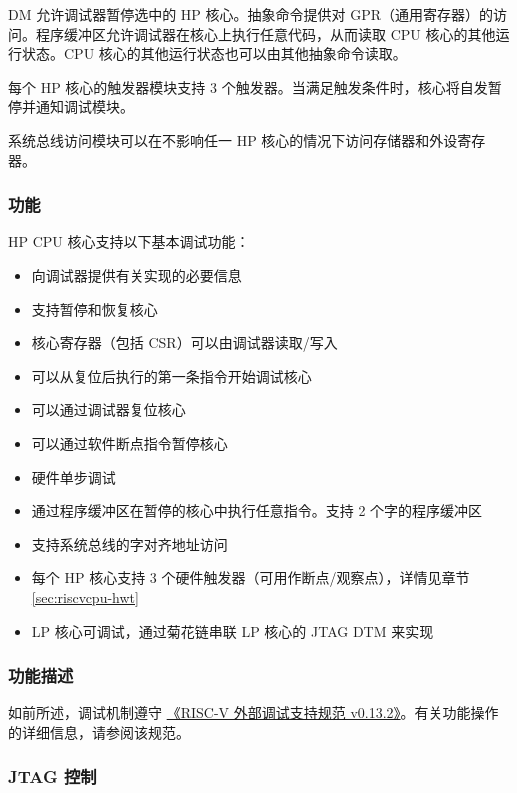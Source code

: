 \documentclass[main\_\_CN.tex]{subfiles}
\begin{document}
DM 允许调试器暂停选中的 HP 核心。抽象命令提供对 GPR（通用寄存器）的访问。程序缓冲区允许调试器在核心上执行任意代码，从而读取 CPU 核心的其他运行状态。CPU 核心的其他运行状态也可以由其他抽象命令读取。

每个 HP 核心的触发器模块支持 3 个触发器。当满足触发条件时，核心将自发暂停并通知调试模块。

系统总线访问模块可以在不影响任一 HP 核心的情况下访问存储器和外设寄存器。


\subsubsection{功能}
\label{sec:riscvcpu-dbg-features}

HP CPU 核心支持以下基本调试功能：

\begin{itemize}
    \item 向调试器提供有关实现的必要信息
    \item 支持暂停和恢复核心
    \item 核心寄存器（包括 CSR）可以由调试器读取/写入
    \item 可以从复位后执行的第一条指令开始调试核心
    \item 可以通过调试器复位核心
    \item 可以通过软件断点指令暂停核心
    \item 硬件单步调试
    \item 通过程序缓冲区在暂停的核心中执行任意指令。支持 2 个字的程序缓冲区
    \item 支持系统总线的字对齐地址访问
    \item 每个 HP 核心支持 3 个硬件触发器（可用作断点/观察点），详情见章节 \ref{sec:riscvcpu-hwt}
    \item LP 核心可调试，通过菊花链串联 LP 核心的 JTAG DTM 来实现
\end{itemize}

\subsubsection{功能描述}
\label{sec:riscvcpu-dbg-func-descr}

如前所述，调试机制遵守 \href{https://riscv.org/wp-content/uploads/2019/03/riscv-debug-release.pdf}{《RISC-V 外部调试支持规范 v0.13.2》}。有关功能操作的详细信息，请参阅该规范。

\subsubsection{JTAG 控制}
\label{sec:riscvcpu-dbg-jtag-cntl}
\end{document}
